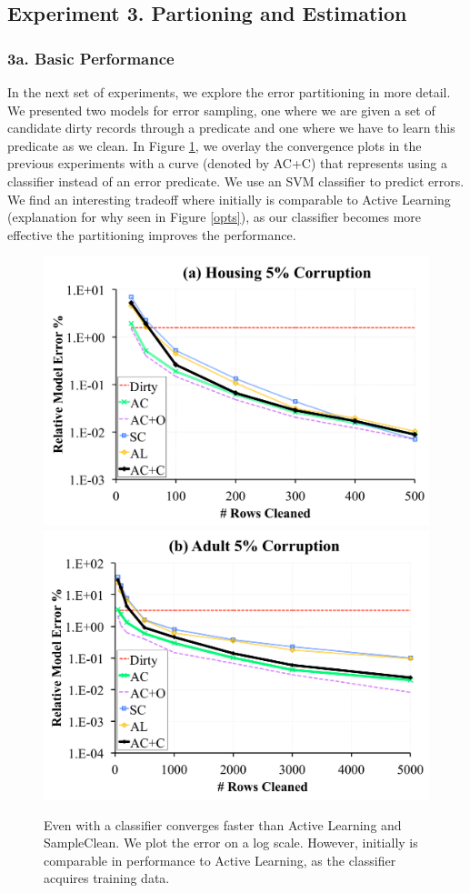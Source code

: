 \subsection{Experiment 3. Partioning and Estimation}

\subsubsection{3a. Basic Performance}
In the next set of experiments, we explore the error partitioning in more detail.
We presented two models for error sampling, one where we are given a set of candidate dirty records through a predicate and one where we have to learn this predicate as we clean.
In Figure \ref{pred-perf}, we overlay the convergence plots in the previous experiments with a curve (denoted by AC+C) that represents \sys using a classifier instead of an error predicate.
We use an SVM classifier to predict errors.
We find an interesting tradeoff where initially \sys is comparable to Active Learning (explanation for why seen in Figure \ref{opts}), as our classifier becomes more effective the partitioning improves the performance.

\begin{figure}[t]
\centering
 \includegraphics[width=0.48\columnwidth]{exp/exp11a.pdf}
 \includegraphics[width=0.48\columnwidth]{exp/exp11b.pdf}
 \caption{Even with a classifier \sys converges faster than Active Learning and SampleClean.
 We plot the error on a log scale. 
 However, initially \sys is comparable in performance to Active Learning, as the classifier acquires training data. \label{pred-perf}}
\end{figure}

